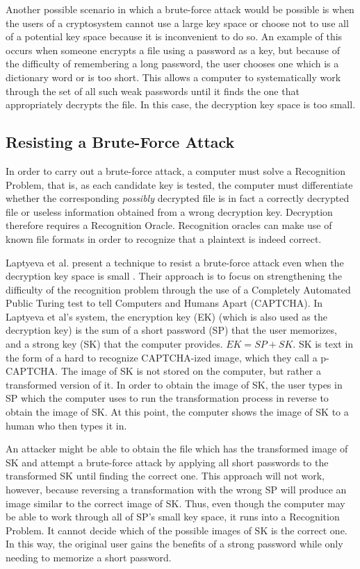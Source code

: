 \documentclass[12pt]{article}
\begin{document}
	Another possible scenario in which a brute-force attack would be possible is when the users of a cryptosystem cannot use a large key space or choose not to use all of a potential key space because it is inconvenient to do so. An example of this occurs when someone encrypts a file using a password as a key, but because of the difficulty of remembering a long password, the user chooses one which is a dictionary word or is too short. This allows a computer to systematically work through the set of all such weak passwords until it finds the one that appropriately decrypts the file. In this case, the decryption key space is too small.

\subsection*{Resisting a Brute-Force Attack}
In order to carry out a brute-force attack, a computer must solve a Recognition Problem, that is, as each candidate key is tested, the computer must differentiate whether the corresponding \emph{possibly} decrypted file is in fact a correctly decrypted file or useless information obtained from a wrong decryption key. Decryption therefore requires a Recognition Oracle. Recognition oracles can make use of known file formats in order to recognize that a plaintext is indeed correct.

	Laptyeva et al. present a technique to resist a brute-force attack even when the decryption key space is small \cite{laptyeva}. Their approach is to focus on strengthening the difficulty of the recognition problem through the use of a Completely Automated Public Turing test to tell Computers and Humans Apart (CAPTCHA). In Laptyeva et al's system, the encryption key (EK) (which is also used as the decryption key) is the sum of a short password (SP) that the user memorizes, and a strong key (SK) that the computer provides. $EK = SP + SK$. SK is text in the form of a hard to recognize CAPTCHA-ized image, which they call a p-CAPTCHA. The image of SK is not stored on the computer, but rather a transformed version of it. In order to obtain the image of SK, the user types in SP which the computer uses to run the transformation process in reverse to obtain the image of SK. At this point, the computer shows the image of SK to a human who then types it in.

	An attacker might be able to obtain the file which has the transformed image of SK and attempt a brute-force attack by applying all short passwords to the transformed SK until finding the correct one. This approach will not work, however, because reversing a transformation with the wrong SP will produce an image similar to the correct image of SK. Thus, even though the computer may be able to work through all of SP's small key space, it runs into a Recognition Problem. It cannot decide which of the possible images of SK is the correct one. In this way, the original user gains the benefits of a strong password while only needing to memorize a short password.
\end{document}
